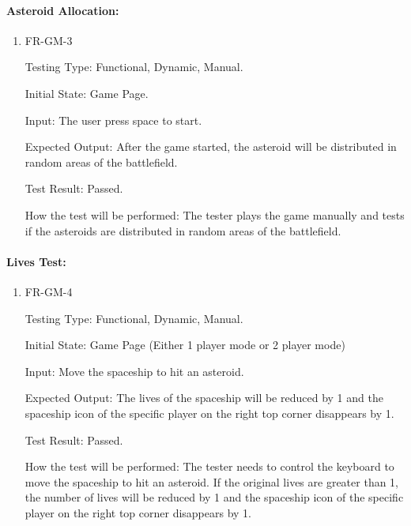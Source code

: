 \documentclass[12pt, titlepage]{article}
\begin{document}
\paragraph{Asteroid Allocation:}
\begin{enumerate}					
\item{FR-GM-3\\}

Testing Type: Functional, Dynamic, Manual.  

Initial State: Game Page.

Input: The user press space to start.

Expected Output: After the game started, the asteroid will be distributed in random areas of the battlefield.

Test Result: Passed.

How the test will be performed: The tester plays the game manually and tests if the asteroids are distributed in random areas of the battlefield.

\end{enumerate}

\paragraph{Lives Test:}
\begin{enumerate}					
\item{FR-GM-4\\}

Testing Type: Functional, Dynamic, Manual.  

Initial State: Game Page (Either 1 player mode or 2 player mode)

Input: Move the spaceship to hit an asteroid.

Expected Output: The lives of the spaceship will be reduced by 1 and the spaceship icon of the specific player on the right top corner disappears by 1.

Test Result: Passed.

How the test will be performed: The tester needs to control the keyboard to move the spaceship to hit an asteroid. If the original lives are greater than 1, the number of lives will be reduced by 1 and the spaceship icon of the specific player on the right top corner disappears by 1.

\end{enumerate}
\end{document}
